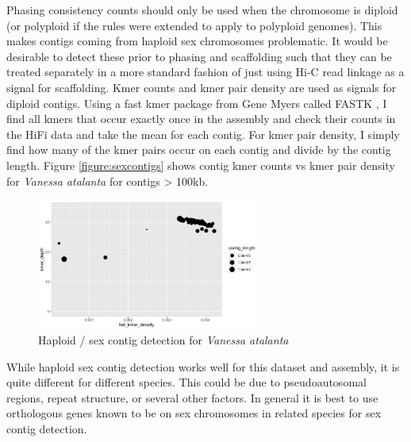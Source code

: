 {\par{
Phasing consistency counts should only be used when the chromosome is diploid (or polyploid if the rules were extended to apply to polyploid genomes). This makes contigs coming from haploid sex chromosomes problematic. It would be desirable to detect these prior to phasing and scaffolding such that they can be treated separately in a more standard fashion of just using Hi-C read linkage as a signal for scaffolding. Kmer counts and kmer pair density are used as signals for diploid contigs. Using a fast kmer package from Gene Myers called FASTK \cite{fastk}, I find all kmers that occur exactly once in the assembly and check their counts in the HiFi data and take the mean for each contig. For kmer pair density, I simply find how many of the kmer pairs occur on each contig and divide by the contig length. Figure \ref{figure:sexcontigs} shows contig kmer counts vs kmer pair density for \textit{Vanessa atalanta} for contigs > 100kb.
}

\begin{figure}[htbp!]
\caption{Haploid / sex contig detection for \textit{Vanessa atalanta}}
\label{figure:sexcontig}
\begin{centering}
\includegraphics[width=0.65\textwidth]{sexcontig.png}
\end{centering}
\end{figure}

\par{
While haploid sex contig detection works well for this dataset and assembly, it is quite different for different species. This could be due to pseudoautosomal regions, repeat structure, or several other factors. In general it is best to use orthologous genes known to be on sex chromosomes in related species for sex contig detection.
}

}
